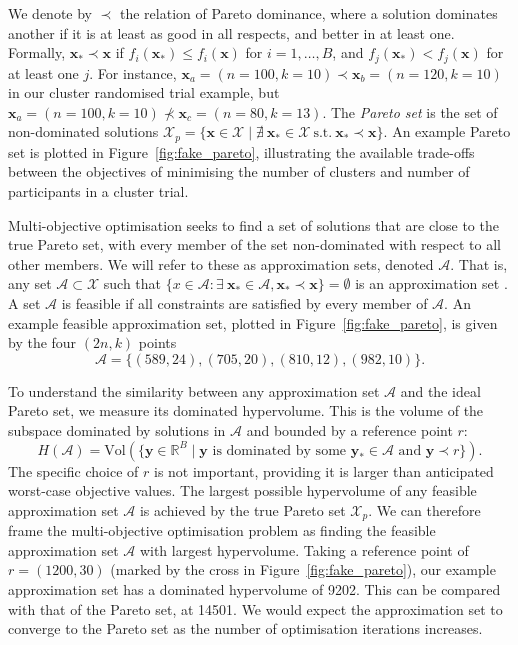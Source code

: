 \documentclass[sagev, Crown]{sagej}
\begin{document}
We denote by $\prec$ the relation of Pareto dominance, where a solution dominates another if it is at least as good in all respects, and better in at least one. Formally, $\mathbf{x}_{*} \prec \mathbf{x}$ if $f_{i}(\mathbf{x}_{*}) \leq f_{i}(\mathbf{x})$ for $i = 1, \ldots , B$, and $f_{j}(\mathbf{x}_{*}) < f_{j}(\mathbf{x})$ for at least one $j$. For instance, $\mathbf{x}_a = (n=100, k=10) \prec \mathbf{x}_b = (n=120, k=10)$ in our cluster randomised trial example, but $\mathbf{x}_a = (n=100, k=10) \nprec \mathbf{x}_c = (n=80, k=13)$. The \emph{Pareto set} is the set of non-dominated solutions $\mathcal{X}_{p} = \{\mathbf{x} \in \mathcal{X} \mid \nexists ~ \mathbf{x}_{*}  \in \mathcal{X} ~\text{s.t.}~ \mathbf{x}_{*} \prec \mathbf{x} \}$. An example Pareto set is plotted in Figure~\ref{fig:fake_pareto}, illustrating the available trade-offs between the objectives of minimising the number of clusters and number of participants in a cluster trial.

Multi-objective optimisation seeks to find a set of solutions that are close to the true Pareto set, with every member of the set non-dominated with respect to all other members. We will refer to these as approximation sets, denoted $\mathcal{A}$. That is, any set $\mathcal{A} \subset \mathcal{X}$ such that $\{ x \in \mathcal{A} : \exists~\mathbf{x}_{*} \in \mathcal{A} , \mathbf{x}_{*} \prec \mathbf{x} \} = \emptyset$ is an approximation set \cite{Emmerich2011}. A set $\mathcal{A}$ is feasible if all constraints are satisfied by every member of $\mathcal{A}$. An example feasible approximation set, plotted in Figure~\ref{fig:fake_pareto}, is given by the four $(2n, k)$ points
\begin{equation}
\mathcal{A} = \{ (589, 24), (705, 20), (810, 12), (982, 10) \}.
\end{equation}

To understand the similarity between any approximation set $\mathcal{A}$ and the ideal Pareto set, we measure its dominated hypervolume. This is the volume of the subspace dominated by solutions in $\mathcal{A}$ and bounded by a reference point $r$:
\begin{equation}
H(\mathcal{A}) = \text{Vol}(\{\mathbf{y} \in \mathbb{R}^{B} \mid \mathbf{y} \text{ is dominated by some } \mathbf{y}_{*} \in \mathcal{A} \text{ and } \mathbf{y} \prec r \}). 
\end{equation}
The specific choice of $r$ is not important, providing it is larger than anticipated worst-case objective values. The largest possible hypervolume of any feasible approximation set $\mathcal{A}$ is achieved by the true Pareto set $\mathcal{X}_{p}$. We can therefore frame the multi-objective optimisation problem as finding the feasible approximation set $\mathcal{A}$ with largest hypervolume. Taking a reference point of $r = (1200, 30)$ (marked by the cross in Figure~\ref{fig:fake_pareto}), our example approximation set has a dominated hypervolume of 9202. This can be compared with that of the Pareto set, at 14501. We would expect the approximation set to converge to the Pareto set as the number of optimisation iterations increases. 
\end{document}

